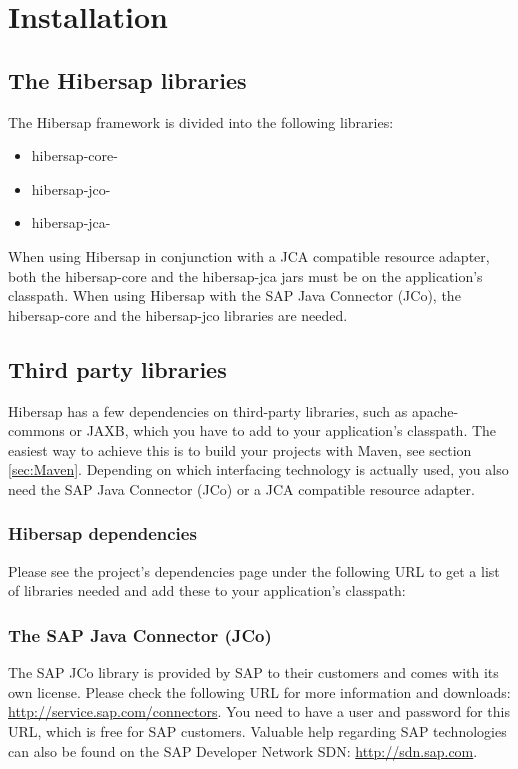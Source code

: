 \chapter{Installation}
\label{cha:Installation}

\section{The Hibersap libraries}

The Hibersap framework is divided into the following libraries:
\begin{itemize}
  \item hibersap-core-\HibersapVersion
  \item hibersap-jco-\HibersapVersion
  \item hibersap-jca-\HibersapVersion
\end{itemize}

When using Hibersap in conjunction with a JCA compatible resource adapter, both the hibersap-core and the hibersap-jca jars must be on the application's classpath. When using Hibersap with the SAP Java Connector (JCo), the hibersap-core and the hibersap-jco libraries are needed. 

\section{Third party libraries}
Hibersap has a few dependencies on third-party libraries, such as apache-commons or JAXB, which you have to add to your application's classpath. The easiest way to achieve this is to build your projects with Maven, see section \ref{sec:Maven}. Depending on which interfacing technology is actually used, you also need the SAP Java Connector (JCo) 
or a JCA compatible resource adapter.

\subsection{Hibersap dependencies}
Please see the project's dependencies page under the following URL to get a list of libraries needed and add these to your application's classpath: \urlHibersapDependencies

\subsection{The SAP Java Connector (JCo)}
The SAP JCo library is provided by SAP to their customers and comes with its own license. Please check the following URL for more information and downloads: \url{http://service.sap.com/connectors}. You need to have a user and password for this URL, which is free for SAP customers. Valuable help regarding SAP technologies can also be found on the SAP Developer Network SDN: \url{http://sdn.sap.com}. 

